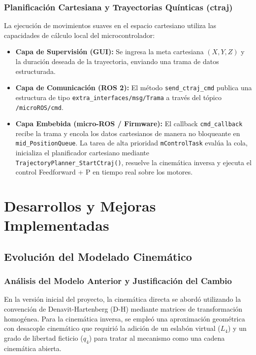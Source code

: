 \documentclass[12pt, a4paper]{report}
\begin{document}
\subsection{Planificación Cartesiana y Trayectorias Quínticas (ctraj)}
La ejecución de movimientos suaves en el espacio cartesiano utiliza las capacidades de cálculo local del microcontrolador:
\begin{itemize}
    \item \textbf{Capa de Supervisión (GUI):} Se ingresa la meta cartesiana $(X, Y, Z)$ y la duración deseada de la trayectoria, enviando una trama de datos estructurada.
    \item \textbf{Capa de Comunicación (ROS 2):} El método \texttt{send\_ctraj\_cmd} publica una estructura de tipo \texttt{extra\_interfaces/msg/Trama} a través del tópico \texttt{/microROS/cmd}.
    \item \textbf{Capa Embebida (micro-ROS / Firmware):} El callback \texttt{cmd\_callback} recibe la trama y encola los datos cartesianos de manera no bloqueante en \texttt{mid\_PositionQueue}. La tarea de alta prioridad \texttt{mControlTask} evalúa la cola, inicializa el planificador cartesiano mediante \texttt{TrajectoryPlanner\_StartCtraj()}, resuelve la cinemática inversa y ejecuta el control Feedforward + P en tiempo real sobre los motores.
\end{itemize}

\chapter{Desarrollos y Mejoras Implementadas}

\section{Evolución del Modelado Cinemático}

\subsection{Análisis del Modelo Anterior y Justificación del Cambio}
En la versión inicial del proyecto, la cinemática directa se abordó utilizando la convención de Denavit-Hartenberg (D-H) mediante matrices de transformación homogénea. Para la cinemática inversa, se empleó una aproximación geométrica con desacople cinemático que requirió la adición de un eslabón virtual ($L_4$) y un grado de libertad ficticio ($q_4$) para tratar al mecanismo como una cadena cinemática abierta. 
\end{document}
